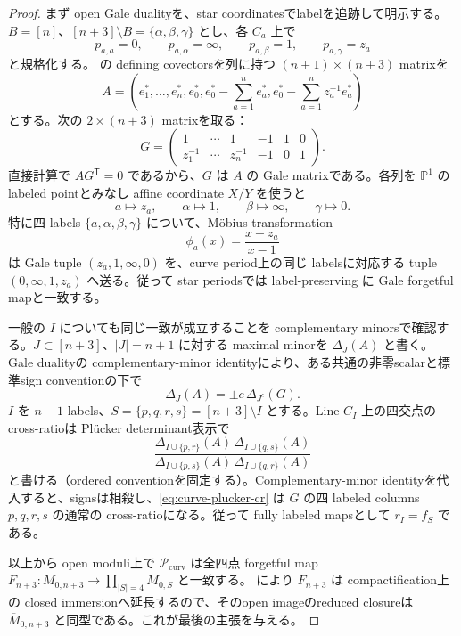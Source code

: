 \documentclass[11pt,a4paper]{ltjsarticle}
\newcommand{\PP}{\mathbb P}
\newcommand{\ov}{\overline}
\newcommand{\cP}{\mathcal P}
\theoremstyle{plain}
\theoremstyle{definition}
\theoremstyle{remark}
\begin{document}
\begin{proof}
まず open Gale dualityを、star coordinatesでlabelを追跡して明示する。$B=[n]$、$[n+3]\setminus B=\{\alpha,\beta,\gamma\}$ とし、各 $C_a$ 上で
\[
 p_{a,a}=0,\qquad p_{a,\alpha}=\infty,\qquad
 p_{a,\beta}=1,\qquad p_{a,\gamma}=z_a
\]
と規格化する。 の defining covectorsを列に持つ $(n+1)\times(n+3)$ matrixを
\begin{equation}
\label{eq:gale-A}
 A=\left(
 e_1^*,\ldots,e_n^*,
 e_0^*,
 e_0^*-\sum_{a=1}^ne_a^*,
 e_0^*-\sum_{a=1}^nz_a^{-1}e_a^*
 \right)
\end{equation}
とする。次の $2\times(n+3)$ matrixを取る：
\begin{equation}
\label{eq:gale-G}
 G=
 \begin{pmatrix}
 1&\cdots&1&-1&1&0\\
 z_1^{-1}&\cdots&z_n^{-1}&-1&0&1
 \end{pmatrix}.
\end{equation}
直接計算で $AG^{\mathsf T}=0$ であるから、$G$ は $A$ の Gale matrixである。各列を $\PP^1$ の labeled pointとみなし affine coordinate $X/Y$ を使うと
\[
 a\longmapsto z_a,\qquad
 \alpha\longmapsto1,\qquad
 \beta\longmapsto\infty,\qquad
 \gamma\longmapsto0.
\]
特に四 labels $\{a,\alpha,\beta,\gamma\}$ について、M\"obius transformation
\[
 \phi_a(x)=\frac{x-z_a}{x-1}
\]
は Gale tuple $(z_a,1,\infty,0)$ を、curve period上の同じ labelsに対応する tuple $(0,\infty,1,z_a)$ へ送る。従って star periodsでは label-preserving に Gale forgetful mapと一致する。

一般の $I$ についても同じ一致が成立することを complementary minorsで確認する。$J\subset[n+3]$、$|J|=n+1$ に対する maximal minorを $\Delta_J(A)$ と書く。Gale dualityの complementary-minor identityにより、ある共通の非零scalarと標準sign conventionの下で
\[
 \Delta_J(A)=\pm c\,\Delta_{J^c}(G).
\]
$I$ を $n-1$ labels、$S=\{p,q,r,s\}= [n+3]\setminus I$ とする。Line $C_I$ 上の四交点の cross-ratioは Pl\"ucker determinant表示で
\begin{equation}
\label{eq:curve-plucker-cr}
 \frac{
  \Delta_{I\cup\{p,r\}}(A)\,
  \Delta_{I\cup\{q,s\}}(A)}{
  \Delta_{I\cup\{p,s\}}(A)\,
  \Delta_{I\cup\{q,r\}}(A)}
\end{equation}
と書ける（ordered conventionを固定する）。Complementary-minor identityを代入すると、signsは相殺し、\eqref{eq:curve-plucker-cr} は $G$ の四 labeled columns $p,q,r,s$ の通常の cross-ratioになる。従って fully labeled mapsとして $r_I=f_S$ である。

以上から open moduli上で $\cP_{\mathrm{curv}}$ は全四点 forgetful map
$F_{n+3}:M_{0,n+3}\to\prod_{|S|=4}M_{0,S}$ と一致する。 により $F_{n+3}$ は compactification上の closed immersionへ延長するので、そのopen imageのreduced closureは $\ov M_{0,n+3}$ と同型である。これが最後の主張を与える。
\end{proof}
\end{document}
